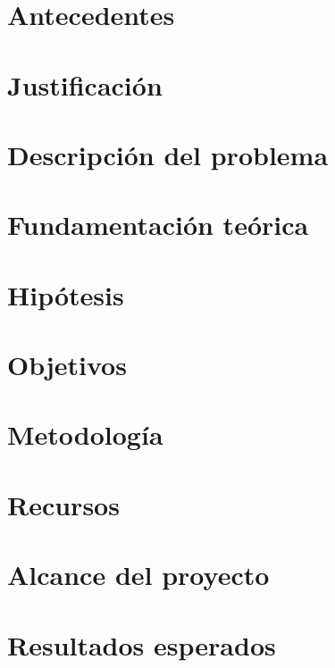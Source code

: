 \documentclass[12pt, letterpaper, spanish, twoside]{article}
\begin{document}
\section{Antecedentes}


\section{Justificación}


\section{Descripción del problema}


\section{Fundamentación teórica}


\section{Hipótesis}


\section{Objetivos}


\section{Metodología}


\section{Recursos}


\section{Alcance del proyecto}


\section{Resultados esperados}


\nocite{*} %
\renewcommand{\refname}{Referencias bibliográficas}


\end{document}
